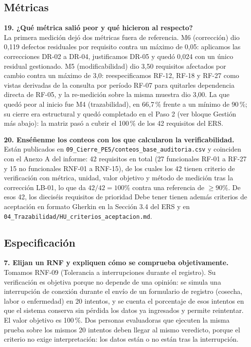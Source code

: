 \subsection*{Métricas}

\noindent\textbf{19. ¿Qué métrica salió peor y qué hicieron al respecto?}\\
La primera medición dejó dos métricas fuera de referencia. M6 (corrección) dio 0,119 defectos residuales por requisito contra un máximo de 0,05: aplicamos las correcciones DR-02 a DR-04, justificamos DR-05 y quedó 0,024 con un único residual gestionado. M5 (modificabilidad) dio 3,50 requisitos afectados por cambio contra un máximo de 3,0: reespecificamos RF-12, RF-18 y RF-27 como vistas derivadas de la consulta por período RF-07 para quitarles dependencia directa de RF-05, y la re-medición sobre la misma muestra dio 3,00. La que quedó peor al inicio fue M4 (trazabilidad), en 66,7\,\% frente a un mínimo de 90\,\%; su cierre era estructural y quedó completado en el Paso 2 (ver bloque Gestión más abajo): la matriz pasó a cubrir el 100\,\% de los 42 requisitos del ERS.

\medskip
\noindent\textbf{20. Enséñenme los conteos con los que calcularon la verificabilidad.}\\
Están publicados en \texttt{09\_Cierre\_PE5/conteos\_base\_auditoria.csv} y coinciden con el Anexo A del informe: 42 requisitos en total (27 funcionales RF-01 a RF-27 y 15 no funcionales RNF-01 a RNF-15), de los cuales los 42 tienen criterio de verificación con métrica, unidad, valor objetivo y método de medición tras la corrección LB-01, lo que da $42/42 = 100\%$ contra una referencia de $\geq 90\%$. De esos 42, los dieciséis requisitos de prioridad Debe tener tienen además criterios de aceptación en formato Gherkin en la Sección 3.4 del ERS y en \texttt{04\_Trazabilidad/HU\_criterios\_aceptacion.md}.

\subsection*{Especificación}

\noindent\textbf{7. Elijan un RNF y expliquen cómo se comprueba objetivamente.}\\
Tomamos RNF-09 (Tolerancia a interrupciones durante el registro). Su verificación es objetiva porque no depende de una opinión: se simula una interrupción de conexión durante el envío de un formulario de registro (cosecha, labor o enfermedad) en 20 intentos, y se cuenta el porcentaje de esos intentos en que el sistema conserva sin pérdida los datos ya ingresados y permite reintentar. El valor objetivo es 100\,\%. Dos personas evaluadoras que ejecuten la misma prueba sobre los mismos 20 intentos deben llegar al mismo veredicto, porque el criterio no exige interpretación: los datos están o no están tras la interrupción.

